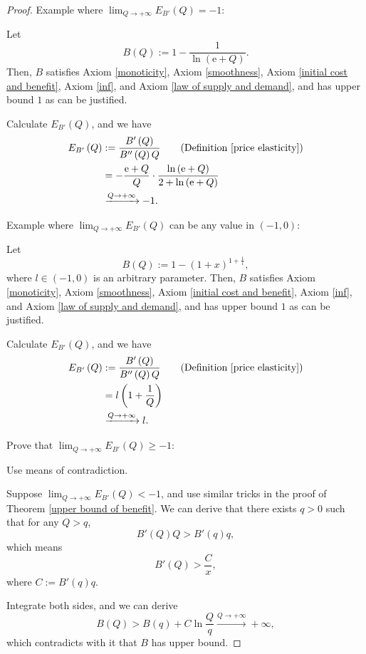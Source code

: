 \documentclass{article}
\begin{document}
\begin{proof}
Example where $\lim_{Q\to+\infty}E_{B'}\left(Q\right)=-1$:

Let
$$B\left(Q\right):=1-\frac1{\ln\left(\mathrm e+Q\right)}.$$
Then, $B$ satisfies Axiom \ref{monoticity}, Axiom \ref{smoothness}, Axiom \ref{initial cost and benefit}, Axiom \ref{inf}, and Axiom \ref{law of supply and demand}, and has upper bound $1$ as can be justified.

Calculate $E_{B'}\left(Q\right)$, and we have
\begin{align*}
E_{B'}\left(Q\right)&:=\frac{B'\left(Q\right)}{B''\left(Q\right)Q}\qquad\text{(Definition \ref{price elasticity})}\\
&=-\frac{\mathrm e+Q}Q\cdot\frac{\ln\left(\mathrm e+Q\right)}{2+\ln\left(\mathrm e+Q\right)}\\
&\xrightarrow{Q\to+\infty}-1.
\end{align*}

Example where $\lim_{Q\to+\infty}E_{B'}\left(Q\right)$ can be any value in $\left(-1,0\right)$:

Let
$$B\left(Q\right):=1-\left(1+x\right)^{1+\frac1l},$$
where $l\in\left(-1,0\right)$ is an arbitrary parameter.
Then, $B$ satisfies Axiom \ref{monoticity}, Axiom \ref{smoothness}, Axiom \ref{initial cost and benefit}, Axiom \ref{inf}, and Axiom \ref{law of supply and demand}, and has upper bound $1$ as can be justified.

Calculate $E_{B'}\left(Q\right)$, and we have
\begin{align*}
E_{B'}\left(Q\right)&:=\frac{B'\left(Q\right)}{B''\left(Q\right)Q}\qquad\text{(Definition \ref{price elasticity})}\\
&=l\left(1+\frac1Q\right)\\
&\xrightarrow{Q\to+\infty}l.
\end{align*}

Prove that $\lim_{Q\to+\infty}E_{B'}\left(Q\right)\ge-1$:

Use means of contradiction.

Suppose $\lim_{Q\to+\infty}E_{B'}\left(Q\right)<-1$,
and use similar tricks in the proof of Theorem \ref{upper bound of benefit}.
We can derive that there exists $q>0$ such that for any $Q>q$,
$$B'\left(Q\right)Q>B'\left(q\right)q,$$
which means
$$B'\left(Q\right)>\frac Cx,$$
where $C:=B'\left(q\right)q$.

Integrate both sides, and we can derive
$$B\left(Q\right)>B\left(q\right)+C\ln\frac Qq\xrightarrow{Q\to+\infty}+\infty,$$
which contradicts with it that $B$ has upper bound.
\end{proof}
\end{document}
